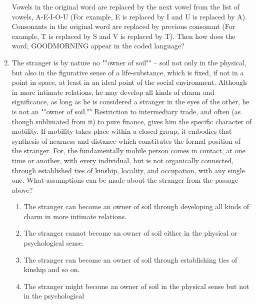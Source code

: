 \documentclass[12pt]{article}
\theoremstyle{remark}
\begin{document}
\begin{enumerate}
Vowels in the original word are replaced by the next vowel from the list of vowels,
A-E-I-O-U (For example, E is replaced by I and U is replaced by A). Consonants
in the original word are replaced by previous consonant (For example, T is
replaced by S and V is replaced by T). 
Then how does the word, GOODMORNING appear in the coded language? 
\begin{enumerate}  \end{enumerate}
\hfill{}
\item The stranger is by nature no ""owner of soil"" -- soil not only in the physical, but also
in the figurative sense of a life-substance, which is fixed, if not in a point in space,
at least in an ideal point of the social environment. Although in more intimate
relations, he may develop all kinds of charm and significance, as long as he is
considered a stranger in the eyes of the other, he is not an ""owner of soil.""
Restriction to intermediary trade, and often (as though sublimated from it) to pure
finance, gives him the specific character of mobility. If mobility takes place within
a closed group, it embodies that synthesis of nearness and distance which constitutes
the formal position of the stranger. For, the fundamentally mobile person comes in
contact, at one time or another, with every individual, but is not organically
connected, through established ties of kinship, locality, and occupation, with any
single one. 
What assumptions can be made about the stranger from the passage above? 
\begin{enumerate}
\item The stranger can become an owner of soil through developing all kinds of charm in
more intimate relations. 
\item The stranger cannot become an owner of soil either in the physical or psychological
sense. 
\item The stranger can become an owner of soil through establishing ties of kinship and
so on. 
\item The stranger might become an owner of soil in the physical sense but not in the
psychological 
\end{enumerate}
\hfill{}

\end{enumerate}
\end{document}
